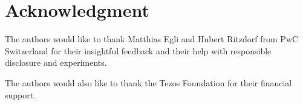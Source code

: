 \section*{Acknowledgment}
The authors would like to thank Matthias Egli and Hubert Ritzdorf from PwC Switzerland for their insightful feedback and their help with responsible disclosure and experiments.

The authors would also like to thank the Tezos Foundation for their financial support.